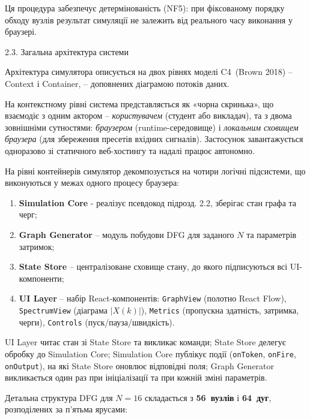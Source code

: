 \documentclass[
]{article}
\begin{document}
Ця процедура забезпечує детермінованість (NF5): при фіксованому порядку
обходу вузлів результат симуляції не залежить від реального часу
виконання у браузері.

\protect{}\label{_Toc228121457}{}2.3. Загальна архітектура
системи

Архітектура симулятора описується на двох рівнях моделі C4~(Brown 2018)
-- Context і Container, -- доповнених діаграмою потоків даних.

На контекстному рівні система представляється як «чорна скринька», що
взаємодіє з одним актором -- \emph{користувачем} (студент або викладач),
та з двома зовнішніми сутностями: \emph{браузером} (runtime-середовище)
і \emph{локальним сховищем браузера} (для збереження пресетів вхідних
сигналів). Застосунок завантажується одноразово зі статичного
веб-хостингу та надалі працює автономно.

На рівні контейнерів симулятор декомпозується на чотири логічні
підсистеми, що виконуються у межах одного процесу браузера:

\begin{enumerate}
\def\labelenumi{\arabic{enumi}.}
\item
  \textbf{Simulation Core} - реалізує псевдокод підрозд. 2.2, зберігає
  стан графа та черг;
\item
  \textbf{Graph Generator} -- модуль побудови DFG для заданого \(N\) та
  параметрів затримок;
\item
  \textbf{State Store} -- централізоване сховище стану, до якого
  підписуються всі UI-компоненти;
\item
  \textbf{UI Layer} -- набір React-компонентів: \texttt{GraphView}
  (полотно React Flow), \texttt{SpectrumView} (діаграма \(|X(k)|\)),
  \texttt{Metrics} (пропускна здатність, затримка, черги),
  \texttt{Controls} (пуск/пауза/швидкість).
\end{enumerate}

UI Layer читає стан зі State Store та викликає команди; State Store
делегує обробку до Simulation Core; Simulation Core публікує події
(\texttt{onToken}, \texttt{onFire}, \texttt{onOutput}), на які State
Store оновлює відповідні поля; Graph Generator викликається один раз при
ініціалізації та при кожній зміні параметрів.

Детальна структура DFG для \(N = 16\) складається з \textbf{56~вузлів} і
\textbf{64~дуг}, розподілених за п'ятьма ярусами:
\end{document}
